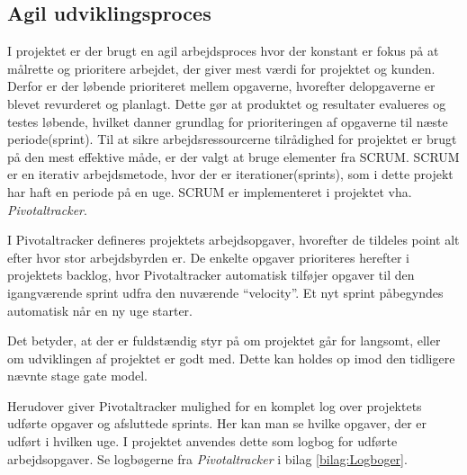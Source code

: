 



\subsection{Agil udviklingsproces}
\label{subsec:agil}
I projektet er der brugt en agil arbejdsproces hvor der konstant er fokus på at målrette og prioritere arbejdet, der giver mest værdi for projektet og kunden. Derfor er der løbende prioriteret mellem opgaverne, hvorefter delopgaverne er blevet revurderet og planlagt. Dette gør at produktet og resultater evalueres og testes løbende, hvilket danner grundlag for prioriteringen af opgaverne til næste periode(sprint). Til at sikre arbejdsressourcerne tilrådighed for projektet er brugt på den mest effektive måde, er der valgt at bruge elementer fra SCRUM. SCRUM er en iterativ arbejdsmetode, hvor  der er iterationer(sprints), som i dette projekt har haft en periode på en uge. SCRUM er implementeret i projektet vha. \textit{Pivotaltracker}. 

I Pivotaltracker defineres projektets arbejdsopgaver, hvorefter de tildeles point alt efter hvor stor arbejdsbyrden er. De enkelte opgaver prioriteres herefter i projektets backlog, hvor Pivotaltracker automatisk tilføjer opgaver til den igangværende sprint udfra den nuværende “velocity”. Et nyt sprint påbegyndes automatisk når en ny uge starter.

Det betyder, at der er fuldstændig styr på om projektet går for langsomt, eller om udviklingen af projektet er godt med. Dette kan holdes op imod den tidligere nævnte stage gate model.

Herudover giver Pivotaltracker mulighed for en komplet log over projektets udførte opgaver og afsluttede sprints. Her kan man se hvilke opgaver, der er udført i hvilken uge. I projektet anvendes dette som logbog for udførte arbejdsopgaver. Se logbøgerne fra \textit{Pivotaltracker} i bilag \ref{bilag:Logboger}.

